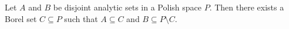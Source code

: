 Let $A$ and $B$ be disjoint analytic sets in a Polish space $P$. Then there exists a Borel set $C \subseteq P$ such that $A \subseteq C$ and $B \subseteq P \setminus C$.

